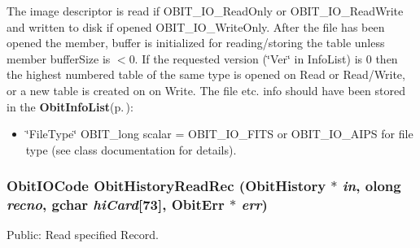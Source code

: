 The image descriptor is read if OBIT\_\-IO\_\-Read\-Only or OBIT\_\-IO\_\-Read\-Write and written to disk if opened OBIT\_\-IO\_\-Write\-Only. After the file has been opened the member, buffer is initialized for reading/storing the table unless member buffer\-Size is $<$0. If the requested version (\char`\"{}Ver\char`\"{} in Info\-List) is 0 then the highest numbered table of the same type is opened on Read or Read/Write, or a new table is created on on Write. The file etc. info should have been stored in the {\bf Obit\-Info\-List}{\rm (p.\,\pageref{structObitInfoList})}: \begin{itemize}
\item \char`\"{}File\-Type\char`\"{} OBIT\_\-long scalar = OBIT\_\-IO\_\-FITS or OBIT\_\-IO\_\-AIPS for file type (see class documentation for details). 
\end{itemize}
\subsubsection{\setlength{\rightskip}{0pt plus 5cm}Obit\-IOCode Obit\-History\-Read\-Rec ({\bf Obit\-History} $\ast$ {\em in}, {\bf olong} {\em recno}, gchar {\em hi\-Card}[73], {\bf Obit\-Err} $\ast$ {\em err})}\label{ObitHistory_8h_a19}


Public: Read specified Record. 

